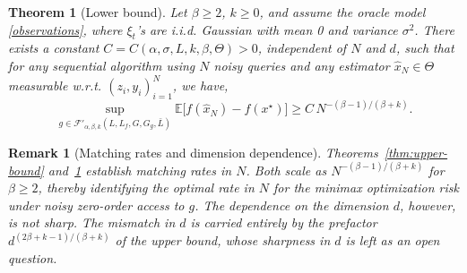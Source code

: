 \documentclass{article}
\newtheorem{theorem}{Theorem}[section]
\newtheorem{remark}{Remark}[section]
\renewcommand{\geq}{\geqslant}
\renewcommand{\hat}{\widehat}
\theoremstyle{definition}
\begin{document}
\begin{theorem}[Lower bound]
\label{thm:lower-bound-bumps}
Let $\beta\geq 2$, $k\geq 0$, and assume the
oracle model \eqref{observations}, where $\xi_t$'s are i.i.d. Gaussian with mean 0 and variance $\sigma^2$. There
exists a constant $C=C(\alpha,\sigma,L,k,\beta,\Theta)>0$,
independent of $N$ and $d$, such that for any sequential algorithm %
using $N$ noisy queries and any estimator
$\hat{x}_N\in\Theta$ measurable w.r.t. $(z_i,y_i)_{i=1}^{N}$,  we have,
\[
\sup_{g\in\mathcal{F}'_{\alpha,\beta,k}(L,L_f,G,G_g,\bar{L})}
\mathbb{E}\bigl[f(\hat{x}_N)-f(x^\star)\bigr]
\geq C\,N^{-(\beta-1)/(\beta+k)}.
\]

\end{theorem}


\begin{remark}[Matching rates and dimension dependence]
\label{rem:matching}
Theorems~\ref{thm:upper-bound} and~\ref{thm:lower-bound-bumps} 
establish matching rates in $N$. Both scale as 
$N^{-(\beta-1)/(\beta+k)}$ for $\beta\geq 2$, thereby identifying 
the optimal rate in $N$ for the minimax optimization risk under 
noisy zero-order access to $g$. The dependence on the dimension 
$d$, however, is not sharp. 
The mismatch in $d$ is carried entirely by the prefactor 
$d^{(2\beta+k-1)/(\beta+k)}$ of the upper bound, whose sharpness 
in $d$ is left as an open question.
\end{remark}
\end{document}
